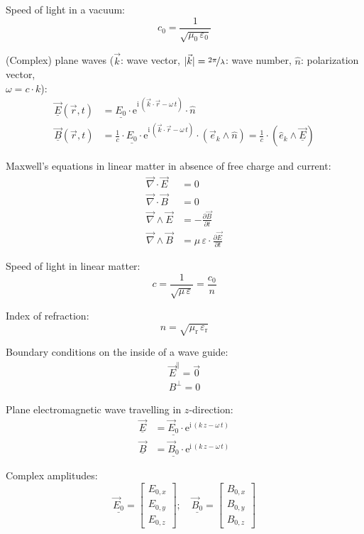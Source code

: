 \documentclass[fontsize=11pt,a4paper]{scrartcl}
\begin{document}
Speed of light in a vacuum:
\[
	c_0=\frac{1}{\sqrt{\mu_0\,\varepsilon_0}}
\]

(Complex) plane waves ($\vec k$: wave vector, $|\vec k|=\nicefrac{2\pi}{\lambda}$: wave number, $\hat n$: polarization vector,\\ $\omega=c\cdot k$):
\begin{align*}
	\underline{\vec E}(\vec r,t)&=\underline{E_0}\cdot\mathrm{e}^{\mathrm{i}\,(\vec k\cdot\vec r-\omega\,t)}\cdot\hat n\\
	\underline{\vec B}(\vec r,t)&=\frac{1}{c}\cdot\underline{E_0}\cdot\mathrm{e}^{\mathrm{i}\,(\vec k\cdot\vec r-\omega\,t)}\cdot(\vec e_k\wedge\hat n)
		=\frac{1}{c}\cdot(\hat e_k\wedge\underline{\vec E})
\end{align*}

Maxwell's equations in linear matter in absence of free charge and current:
\begin{align*}
	\vec\nabla\cdot\vec E&=0\\
	\vec\nabla\cdot\vec B&=0\\
	\vec\nabla\wedge\vec E&=-\frac{\partial\vec B}{\partial t}\\
	\vec\nabla\wedge\vec B&=\mu\,\varepsilon\cdot\frac{\partial\vec E}{\partial t}
\end{align*}

Speed of light in linear matter:
\[
	c=\frac{1}{\sqrt{\mu\,\varepsilon}}=\frac{c_0}{n}
\]

Index of refraction:
\[
	n=\sqrt{\mu_\mathrm{r}\,\varepsilon_\mathrm{r}}
\]

Boundary conditions on the inside of a wave guide:
\begin{gather*}
	\vec E^\parallel=\vec 0\\
	B^\perp=0
\end{gather*}

Plane electromagnetic wave travelling in $z$-direction:
\begin{align*}
	\underline{\vec E}&=\underline{\vec E_0}\cdot\mathrm{e}^{\mathrm{i}\,(k\,z-\omega\,t)}\\
	\underline{\vec B}&=\underline{\vec B_0}\cdot\mathrm{e}^{\mathrm{i}\,(k\,z-\omega\,t)}
\end{align*}

Complex amplitudes:
\begin{equation*}
	\underline{\vec E_0}=\begin{bmatrix}E_{0,x}\\E_{0,y}\\E_{0,z}\end{bmatrix};\quad
	\underline{\vec B_0}=\begin{bmatrix}B_{0,x}\\B_{0,y}\\B_{0,z}\end{bmatrix}
\end{equation*}
\end{document}
